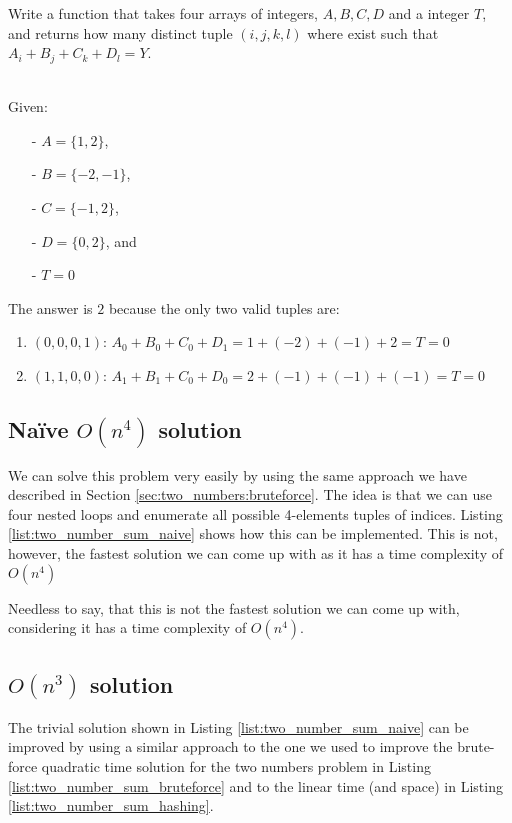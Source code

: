 \begin{exercise}
Write a function that takes four arrays of integers, $A,B,C,D$ and a integer $T$,
and returns how many distinct tuple $(i,j,k,l)$ where exist such that $A_i+B_j+C_k+D_l = Y$.

\begin{example}
\hfill \\
Given:
	\begin{itemize}
		\item[-] 	$A=\{1,2\}$,
		\item[-] 	$B=\{-2,-1\}$,
		\item[-] 	$C=\{-1,2\}$,
		\item[-]	$D=\{0,2\}$, and 
		\item[-] 	$T = 0$
	\end{itemize}
The answer is $2$ because the only two valid tuples are:
\begin{enumerate}
	\item $(0,0,0,1)$: $A_0 + B_0 + C_0 + D_1 = 1 + (-2) + (-1) + 2 = T = 0$
	\item $(1,1,0,0)$: $A_1 + B_1 + C_0 + D_0 = 2 + (-1) + (-1) + (-1) = T = 0$
\end{enumerate}
\end{example}
\end{exercise}

\subsection{Na\"ive $O(n^4)$ solution}
We can solve this problem very easily by using the same approach we have described in Section \ref{sec:two_numbers:bruteforce}.
The idea is that we can use four nested loops and enumerate all possible 4-elements tuples of indices. Listing \ref{list:two_number_sum_naive} shows how this can be implemented.
This is not, however,  the fastest solution we can come up with as it has a time complexity of $O(n^4)$



Needless to say, that this is not the fastest solution we can come up with, considering it has a time complexity of $O(n^4)$.

\subsection{$O(n^3)$ solution}
The trivial solution shown in Listing \ref{list:two_number_sum_naive} can be improved by using a similar approach to the one we used to improve the brute-force 
quadratic time solution for the two numbers problem in Listing \ref{list:two_number_sum_bruteforce} and to the linear time (and space) in Listing \ref{list:two_number_sum_hashing}.

